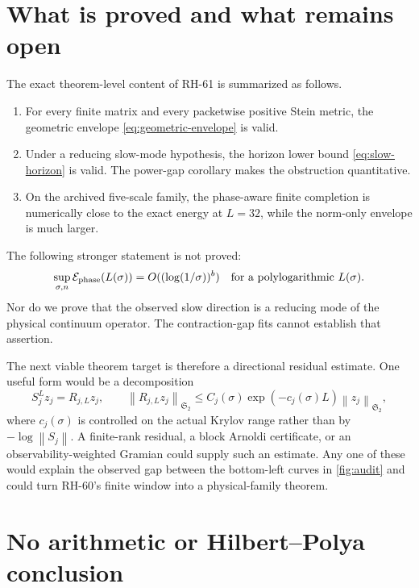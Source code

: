\documentclass[11pt]{article}
\theoremstyle{remark}
\newcommand{\norm}[1]{\left\lVert#1\right\rVert}
\newcommand{\HS}{\mathfrak S_2}
\newcommand{\cE}{\mathcal E}
\begin{document}
\section{What is proved and what remains open}
\label{sec:boundary}

The exact theorem-level content of RH-61 is summarized as follows.

\begin{enumerate}[leftmargin=2.2em]
 \item For every finite matrix and every packetwise positive Stein metric,
       the geometric envelope \eqref{eq:geometric-envelope} is valid.
 \item Under a reducing slow-mode hypothesis, the horizon lower bound
       \eqref{eq:slow-horizon} is valid.  The power-gap corollary makes the
       obstruction quantitative.
 \item On the archived five-scale family, the phase-aware finite completion
       is numerically close to the exact energy at $L=32$, while the
       norm-only envelope is much larger.
\end{enumerate}

The following stronger statement is not proved:
\begin{equation}
 \sup_{\sigma,n} \cE_{\rm phase}(L(\sigma))
 =O((\log(1/\sigma))^b)
 \quad\text{for a polylogarithmic }L(\sigma).
 \label{eq:unproved-target}
\end{equation}
Nor do we prove that the observed slow direction is a reducing mode of the
physical continuum operator.  The contraction-gap fits cannot establish
that assertion.

The next viable theorem target is therefore a directional residual estimate.
One useful form would be a decomposition
\begin{equation}
 S_j^Lz_j=R_{j,L}z_j,
 \qquad
 \norm{R_{j,L}z_j}_{\HS}
 \le C_j(\sigma)\exp(-c_j(\sigma)L)\norm{z_j}_{\HS},
 \label{eq:directional-target}
\end{equation}
where $c_j(\sigma)$ is controlled on the actual Krylov range rather than by
$-\log\norm{S_j}$.  A finite-rank residual, a block Arnoldi certificate, or
an observability-weighted Gramian could supply such an estimate.  Any one of
these would explain the observed gap between the bottom-left curves in
\cref{fig:audit} and could turn RH-60's finite window into a physical-family
theorem.

\section{No arithmetic or Hilbert--Polya conclusion}
\end{document}
